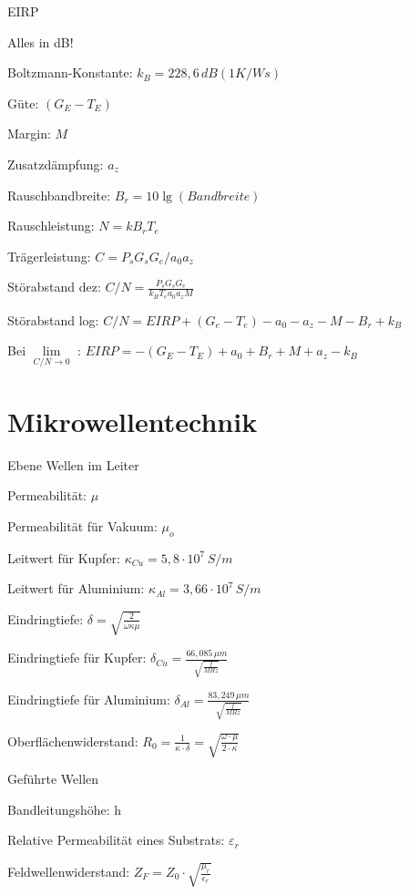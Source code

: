 \documentclass[german]{latex4ei/latex4ei_sheet}
\begin{document}
    \begin{sectionbox}{EIRP}
        \item Alles in dB!
        \item Boltzmann-Konstante: $k_B = 228,6\,dB(1K/Ws)$
        \item Güte: $(G_E-T_E)$ 
        \item Margin: $M$
        \item Zusatzdämpfung: $a_z$
        \item Rauschbandbreite: $B_r = 10 \lg(Bandbreite)$
        \item Rauschleistung: $N = kB_rT_e$
        \item Trägerleistung: $C = P_s G_s G_e/a_0 a_z$
        \item Störabstand dez: $C/N = \frac{P_s G_s G_e}{k_B T_e a_0 a_z M}$
        \item Störabstand log: $C/N = EIRP + (G_e-T_e)-a_0-a_z-M-B_r+k_B$
        \item Bei $\lim\limits_{C/N\rightarrow 0}$ : $EIRP = -(G_E-T_E) + a_0 + B_r + M + a_z - k_B$    
    \end{sectionbox}
\section{Mikrowellentechnik}
    \begin{sectionbox}{Ebene Wellen im Leiter}
        \item Permeabilität: $\mu$
        \item Permeabilität für Vakuum: $\mu_o$
        \item Leitwert für Kupfer: $\kappa_{Cu} = 5,8 \cdot 10^7\, S/m$
        \item Leitwert für Aluminium: $\kappa_{Al} = 3,66 \cdot 10^7\, S/m$
        \item Eindringtiefe: $\delta = \sqrt{\frac{2}{\omega \kappa \mu}}$
        \item Eindringtiefe für Kupfer: $\delta_{Cu} = \frac{66,085\,\mu m}{\sqrt{\frac{f}{MHz}}}$
        \item Eindringtiefe für Aluminium: $\delta_{Al} = \frac{83,249\,\mu m}{\sqrt{\frac{f}{MHz}}}$
        \item Oberflächenwiderstand: $R_0 = \frac{1}{\kappa \cdot \delta} = \sqrt{\frac{\omega\cdot \mu}{2\cdot \kappa}}$
    \end{sectionbox}
    \begin{sectionbox}{Geführte Wellen}
        \item Bandleitungshöhe: h
        \item Relative Permeabilität eines Substrats: $\varepsilon_r$
        \item Feldwellenwiderstand: $Z_F = Z_0 \cdot \sqrt{\frac{\mu_r}{\epsilon_r}}$
    \end{sectionbox}
\end{document}
